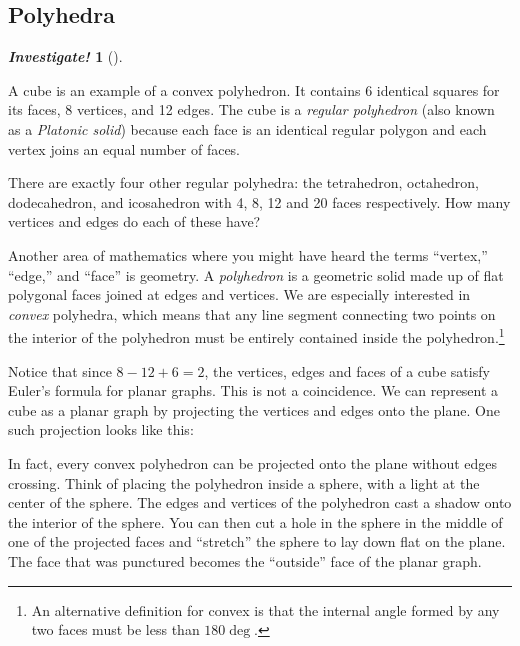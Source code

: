\documentclass[10pt,]{book}
\theoremstyle{plain}
\theoremstyle{definition}
\theoremstyle{definition}
\newtheorem{investigation}[project]{\emph{Investigate!}}
\theoremstyle{definition}
\numberwithin{equation}{chapter}
\newcommand{\vtx}[2]{node[fill,circle,inner sep=0pt, minimum size=4pt,label=#1:#2]{}}
\renewcommand{\v}{\vtx{above}{}}
\begin{document}
\subsection[Polyhedra]{Polyhedra}\label{subsection-38}
\begin{investigation}[]\label{investigation-32}

A cube is an example of a convex polyhedron. It contains 6 identical squares for its faces, 8 vertices, and 12 edges. The cube is a \emph{regular polyhedron} (also known as a \emph{Platonic solid}) because each face is an identical regular polygon and each vertex joins an equal number of faces.
%
\par

There are exactly four other regular polyhedra: the tetrahedron, octahedron, dodecahedron, and icosahedron with 4, 8, 12 and 20 faces respectively. How many vertices and edges do each of these have?
%
\end{investigation}

Another area of mathematics where you might have heard the terms ``vertex,'' ``edge,'' and ``face'' is geometry. A \emph{polyhedron} is a geometric solid made up of flat polygonal faces joined at edges and vertices. We are especially interested in \emph{convex} polyhedra, which means that any line segment connecting two points on the interior of the polyhedron must be entirely contained inside the polyhedron.\footnote{An alternative definition for convex is that the internal angle formed by any two faces must be less than \(180\deg\).\label{fn-13}}
%
\par

Notice that since \(8 - 12 + 6 = 2\), the vertices, edges and faces of a cube satisfy Euler's formula for planar graphs. This is not a coincidence. We can represent a cube as a planar graph by projecting the vertices and edges onto the plane. One such projection looks like this:
%
\leavevmode%
\begin{figure}
\centering
{
}
\end{figure}
\par

In fact, every convex polyhedron can be projected onto the plane without edges crossing. Think of placing the polyhedron inside a sphere, with a light at the center of the sphere. The edges and vertices of the polyhedron cast a shadow onto the interior of the sphere. You can then cut a hole in the sphere in the middle of one of the projected faces and ``stretch'' the sphere to lay down flat on the plane. The face that was punctured becomes the ``outside'' face of the planar graph.
%
\par
\end{document}
